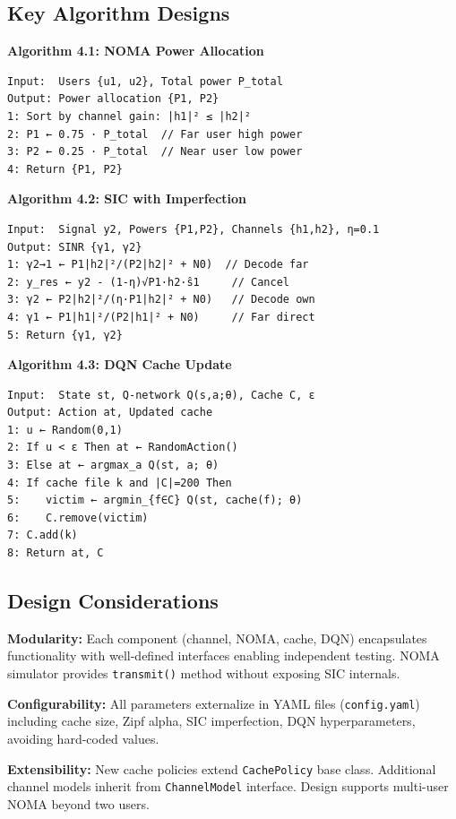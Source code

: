 \documentclass[12pt,a4paper]{article}
\begin{document}
\subsection{Key Algorithm Designs}

\textbf{Algorithm 4.1: NOMA Power Allocation}
\begin{verbatim}
Input:  Users {u1, u2}, Total power P_total
Output: Power allocation {P1, P2}
1: Sort by channel gain: |h1|² ≤ |h2|²
2: P1 ← 0.75 · P_total  // Far user high power
3: P2 ← 0.25 · P_total  // Near user low power
4: Return {P1, P2}
\end{verbatim}

\textbf{Algorithm 4.2: SIC with Imperfection}
\begin{verbatim}
Input:  Signal y2, Powers {P1,P2}, Channels {h1,h2}, η=0.1
Output: SINR {γ1, γ2}
1: γ2→1 ← P1|h2|²/(P2|h2|² + N0)  // Decode far
2: y_res ← y2 - (1-η)√P1·h2·ŝ1     // Cancel
3: γ2 ← P2|h2|²/(η·P1|h2|² + N0)   // Decode own
4: γ1 ← P1|h1|²/(P2|h1|² + N0)     // Far direct
5: Return {γ1, γ2}
\end{verbatim}

\textbf{Algorithm 4.3: DQN Cache Update}
\begin{verbatim}
Input:  State st, Q-network Q(s,a;θ), Cache C, ε
Output: Action at, Updated cache
1: u ← Random(0,1)
2: If u < ε Then at ← RandomAction()
3: Else at ← argmax_a Q(st, a; θ)
4: If cache file k and |C|=200 Then
5:    victim ← argmin_{f∈C} Q(st, cache(f); θ)
6:    C.remove(victim)
7: C.add(k)
8: Return at, C
\end{verbatim}

\subsection{Design Considerations}

\textbf{Modularity:} Each component (channel, NOMA, cache, DQN) encapsulates functionality with well-defined interfaces enabling independent testing. NOMA simulator provides \texttt{transmit()} method without exposing SIC internals.

\textbf{Configurability:} All parameters externalize in YAML files (\texttt{config.yaml}) including cache size, Zipf alpha, SIC imperfection, DQN hyperparameters, avoiding hard-coded values.

\textbf{Extensibility:} New cache policies extend \texttt{CachePolicy} base class. Additional channel models inherit from \texttt{ChannelModel} interface. Design supports multi-user NOMA beyond two users.
\end{document}
